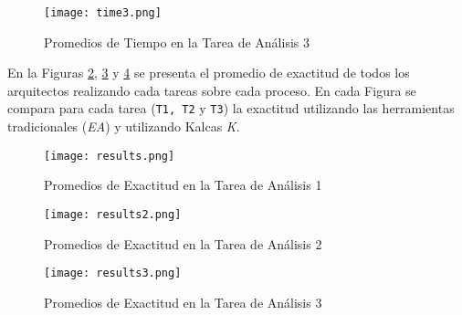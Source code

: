 \begin{figure}[!t]
\begin{center}
	\texttt{[image: time3.png]}
	\caption{Promedios de Tiempo en la Tarea de An\'alisis 3}
	\label{fig:time3}
\end{center}
\end{figure}


En la Figuras \ref{fig:results}, \ref{fig:results2} y \ref{fig:results3} se presenta el promedio de exactitud de todos los arquitectos realizando cada tareas sobre cada proceso. En cada Figura se compara para cada tarea (\texttt{T1, T2} y \texttt{T3}) la exactitud utilizando las herramientas tradicionales (\textit{EA}) y utilizando Kalcas \textit{K}.


\begin{figure}[!t]
\begin{center}
	\texttt{[image: results.png]}
	\caption{Promedios de Exactitud en la Tarea de An\'alisis 1}
	\label{fig:results}
\end{center}
\end{figure}

\begin{figure}[!t]
\begin{center}
	\texttt{[image: results2.png]}
	\caption{Promedios de Exactitud en la Tarea de An\'alisis 2}
	\label{fig:results2}
\end{center}
\end{figure}

\begin{figure}[!t]
\begin{center}
	\texttt{[image: results3.png]}
	\caption{Promedios de Exactitud en la Tarea de An\'alisis 3}
	\label{fig:results3}
\end{center}
\end{figure}


